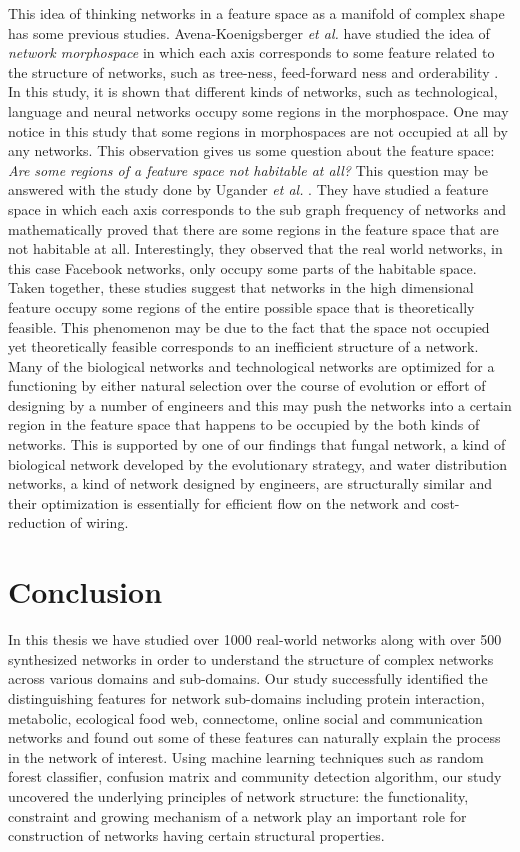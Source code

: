 \documentclass{article}
\begin{document}
This idea of thinking networks in a feature space as a manifold of complex shape has some previous studies. Avena-Koenigsberger \textit{et al.} have studied the idea of \textit{network morphospace} in which each axis corresponds to some feature related to the structure of networks, such as tree-ness, feed-forward ness and orderability \cite{NetworkMorphospace}. In this study, it is shown that different kinds of networks, such as technological, language and neural networks occupy some regions in the morphospace. One may notice in this study that some regions in morphospaces are not occupied at all by any networks. This observation gives us some question about the feature space: \textit{Are some regions of a feature space not habitable at all?} This question may be answered with the study done by Ugander \textit{et al.} \cite{Ugander:2013}. They have studied a feature space in which each axis corresponds to the sub graph frequency of networks and mathematically proved that there are some regions in the feature space that are not habitable at all. Interestingly, they observed that the real world networks, in this case Facebook networks, only occupy some parts of the habitable space. Taken together, these studies suggest that networks in the high dimensional feature occupy some regions of the entire possible space that is theoretically feasible. This phenomenon may be due to the fact that the space not occupied yet theoretically feasible corresponds to an inefficient structure of a network. Many of the biological networks and technological networks are optimized for a functioning by either natural selection over the course of evolution or effort of designing by a number of engineers and this may push the networks into a certain region in the feature space that happens to be occupied by the both kinds of networks. This is supported by one of our findings that fungal network, a kind of biological network developed by the evolutionary strategy, and water distribution networks, a kind of network designed by engineers, are structurally similar and their optimization is essentially for efficient flow on the network and cost-reduction of wiring.
 
 
\newpage

 \section{Conclusion}
 In this thesis we have studied over 1000 real-world networks along with over 500 synthesized networks in order to understand the structure of complex networks across various domains and sub-domains. Our study successfully identified the distinguishing features for network sub-domains including protein interaction, metabolic, ecological food web, connectome, online social and communication networks and found out some of these features can naturally explain the process in the network of interest. Using machine learning techniques such as random forest classifier, confusion matrix and community detection algorithm, our study uncovered the underlying principles of network structure: the functionality, constraint and growing mechanism of a network play an important role for construction of networks having certain structural properties.
 
\end{document}
